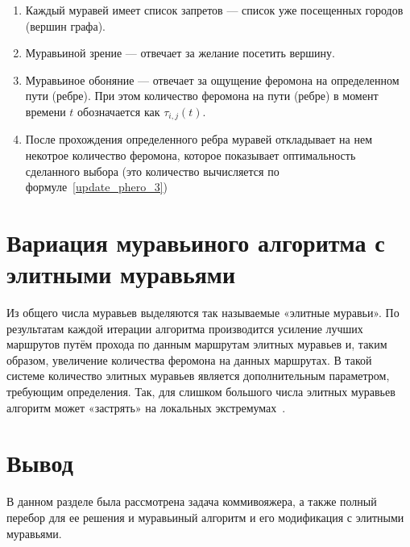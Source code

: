 \begin{enumerate}[label=\arabic*)]
	\item Каждый муравей имеет список запретов --- список уже посещенных городов (вершин графа).
	\item Муравьиной зрение --- отвечает за желание посетить вершину.
	\item Муравьиное обоняние --- отвечает за ощущение феромона на определенном пути (ребре). При этом количество феромона на пути (ребре) в момент времени $t$ обозначается как $\tau_{i, j} (t)$.
	\item После прохождения определенного ребра муравей откладывает на нем некотрое количество феромона, которое показывает оптимальность сделанного выбора (это количество вычисляется по формуле~\eqref{update_phero_3})
\end{enumerate}

\section{Вариация муравьиного алгоритма с элитными муравьями}

Из общего числа муравьев выделяются так называемые «элитные муравьи». По результатам каждой итерации алгоритма производится усиление лучших маршрутов путём прохода по данным маршрутам элитных муравьев и, таким образом, увеличение количества феромона на данных маршрутах. В такой системе количество элитных муравьев является дополнительным параметром, требующим определения. Так, для слишком большого числа элитных муравьев алгоритм может «застрять» на локальных экстремумах~\cite{ant-alg}.

\section*{Вывод}

В данном разделе была рассмотрена задача коммивояжера, а также полный перебор для ее решения и муравьиный алгоритм и его модификация с элитными муравьями.